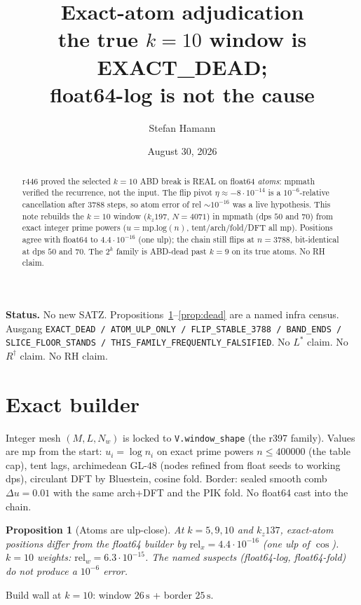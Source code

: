 \documentclass[11pt]{article}
\title{\bfseries Exact-atom adjudication\\[2mm]
\large the true $k=10$ window is EXACT\_DEAD;\\
float64-log is not the cause}
\author{Stefan Hamann}
\date{August 30, 2026}
\newtheorem{prop}{Proposition}
\begin{document}
\maketitle

\begin{abstract}\noindent
r446 proved the selected $k=10$ ABD break is REAL
on float64 \emph{atoms}: mpmath verified the
recurrence, not the input.
The flip pivot $\eta\approx -8\cdot 10^{-14}$ is a
$10^{-6}$-relative cancellation after $3788$ steps,
so atom error of rel $\sim 10^{-16}$ was a live
hypothesis.
This note rebuilds the $k=10$ window
($k_z197$, $N=4071$) in mpmath (dps $50$ and $70$)
from exact integer prime powers
($u=\mathrm{mp.log}(n)$, tent/arch/fold/DFT all mp).
Positions agree with float64 to $4.4\cdot 10^{-16}$
(one ulp); the chain still flips at $n=3788$,
bit-identical at dps $50$ and $70$.
The $2^k$ family is ABD-dead past $k=9$ on its
true atoms.
No RH claim.
\end{abstract}

\medskip\noindent
\textbf{Status.}\enspace
No new SATZ.
Propositions~\ref{prop:atoms}--\ref{prop:dead} are a
named infra census.
Ausgang
\texttt{EXACT\_DEAD / ATOM\_ULP\_ONLY / FLIP\_STABLE\_3788 / BAND\_ENDS / SLICE\_FLOOR\_STANDS / THIS\_FAMILY\_FREQUENTLY\_FALSIFIED}.
No $L^{*}$ claim.  No $R^{\dagger}$ claim.  No RH claim.

\section{Exact builder}\label{sec:build}

Integer mesh $(M,L,N_w)$ is locked to
\texttt{V.window\_shape} (the r397 family).
Values are mp from the start:
$u_i=\log n_i$ on exact prime powers
$n\le 400000$ (the table cap),
tent lags, archimedean GL-$48$ (nodes refined
from float seeds to working dps), circulant DFT
by Bluestein, cosine fold.
Border: sealed smooth comb $\Delta u=0.01$ with
the same arch+DFT and the PIK fold.
No float64 cast into the chain.

\begin{prop}[Atoms are ulp-close]\label{prop:atoms}
At $k=5,9,10$ and $k_z137$, exact-atom positions
differ from the float64 builder by
$\mathrm{rel}_x=4.4\cdot 10^{-16}$ (one ulp of
$\cos$).
$k=10$ weights: $\mathrm{rel}_w=6.3\cdot 10^{-15}$.
The named suspects (float64-log, float64-fold)
do not produce a $10^{-6}$ error.
\end{prop}

Build wall at $k=10$: window $26\,\mathrm{s}$ +
border $25\,\mathrm{s}$.
\end{document}

